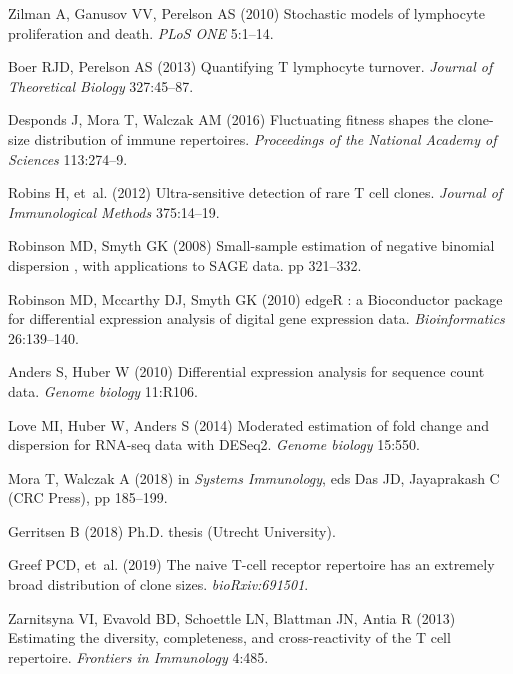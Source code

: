 \documentclass[pre,twocolumn,english,longbibliography]{revtex4}
\newcommand{\<}{\langle}
\renewcommand{\>}{\rangle}
\begin{document}
\begin{thebibliography}{10}
Zilman A, Ganusov VV, Perelson AS
\newblock (2010) {Stochastic models of lymphocyte proliferation and death}.
\newblock \emph{PLoS ONE} 5:1--14.

Boer RJD, Perelson AS
\newblock (2013) {Quantifying T lymphocyte turnover}.
\newblock \emph{Journal of Theoretical Biology} 327:45--87.

Desponds J, Mora T, Walczak AM
\newblock (2016) {Fluctuating fitness shapes the clone-size distribution of
  immune repertoires.}
\newblock \emph{Proceedings of the National Academy of Sciences} 113:274--9.

Robins H, {et~al.}
\newblock (2012) {Ultra-sensitive detection of rare T cell clones}.
\newblock \emph{Journal of Immunological Methods} 375:14--19.

Robinson MD, Smyth GK
\newblock (2008) {Small-sample estimation of negative binomial dispersion ,
  with applications to SAGE data}.
\newblock pp 321--332.

Robinson MD, Mccarthy DJ, Smyth GK
\newblock (2010) {edgeR : a Bioconductor package for differential expression
  analysis of digital gene expression data}.
\newblock \emph{Bioinformatics} 26:139--140.

Anders S, Huber W
\newblock (2010) {Differential expression analysis for sequence count data.}
\newblock \emph{Genome biology} 11:R106.

Love MI, Huber W, Anders S
\newblock (2014) {Moderated estimation of fold change and dispersion for
  RNA-seq data with DESeq2.}
\newblock \emph{Genome biology} 15:550.

Mora T, Walczak A
\newblock (2018) in \emph{Systems Immunology}, eds{} Das JD, Jayaprakash C
\newblock (CRC Press), pp 185--199.

Gerritsen B
\newblock (2018) Ph.D. thesis (Utrecht University).

Greef PCD, {et~al.}
\newblock (2019) {The naive T-cell receptor repertoire has an extremely broad
  distribution of clone sizes}.
\newblock \emph{bioRxiv:691501}.

Zarnitsyna VI, Evavold BD, Schoettle LN, Blattman JN, Antia R
\newblock (2013) {Estimating the diversity, completeness, and cross-reactivity
  of the T cell repertoire}.
\newblock \emph{Frontiers in Immunology} 4:485.


\end{thebibliography}
\end{document}
